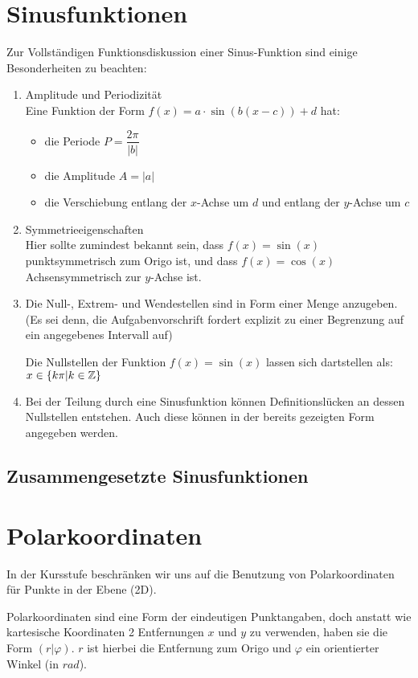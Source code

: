 \documentclass[../MAIN/main.tex]{subfiles}
\begin{document}
\section{Sinusfunktionen}
Zur Vollständigen Funktionsdiskussion einer Sinus-Funktion sind einige Besonderheiten zu beachten:
\begin{enumerate}
  \item Amplitude und Periodizität\\
  Eine Funktion der Form $f(x)=a\cdot\sin(b(x-c))+d$ hat:
  \begin{itemize}
    \item die Periode $P = \dfrac{2\pi}{|b|}$
    \item die Amplitude $A = |a|$
    \item die Verschiebung entlang der $x$-Achse um $d$ und entlang der $y$-Achse um $c$
    \end{itemize}
  \item Symmetrieeigenschaften\\
  Hier sollte zumindest bekannt sein, dass $f(x)=\sin(x)$ punktsymmetrisch zum Origo ist, und dass $f(x)=\cos(x)$ Achsensymmetrisch zur $y$-Achse ist.
  \item Die Null-, Extrem- und Wendestellen sind in Form einer Menge anzugeben. (Es sei denn, die Aufgabenvorschrift fordert explizit zu einer Begrenzung auf ein angegebenes Intervall auf)\\
  \begin{Beispiel}
    Die Nullstellen der Funktion $f(x)=\sin(x)$ lassen sich dartstellen als: $x \in \{k\pi|k \in \mathbb{Z}\}$
  \end{Beispiel}
  \item Bei der Teilung durch eine Sinusfunktion können Definitionslücken an dessen Nullstellen entstehen. Auch diese können in der bereits gezeigten Form angegeben werden.
  \end{enumerate}
\subsection{Zusammengesetzte Sinusfunktionen}
\section{Polarkoordinaten}
In der Kursstufe beschränken wir uns auf die Benutzung von Polarkoordinaten für Punkte in der Ebene (2D).
\begin{Definition}
  Polarkoordinaten sind eine Form der eindeutigen Punktangaben, doch anstatt wie kartesische Koordinaten 2 Entfernungen $x$ und $y$ zu verwenden, haben sie die Form $(r|\varphi)$. $r$ ist hierbei die Entfernung zum Origo und $\varphi$ ein orientierter Winkel (in $rad$).
\end{Definition}
\end{document}
